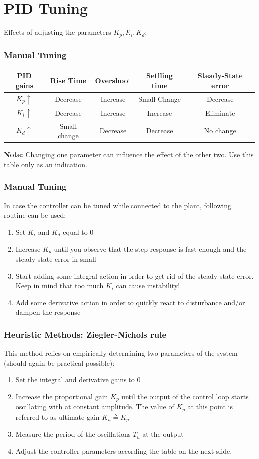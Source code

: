 \section{PID Tuning}

\begin{frame}
	Effects of adjusting the parameters $K_p, K_i, K_d$:
	\vspace{1em}
	\frametitle{Manual Tuning}
	{
	\small
	\begin{tabular}{c | c | c | c | c }
		PID gains	&	Rise Time 	&	Overshoot	&	Setlling time	&	Steady-State error \\
		\hline
		$K_p \uparrow$ & Decrease	&	Increase	&	Small Change	&	Decrease \\
		$K_i \uparrow$ & Decrease	&	Increase	&	Increase		&	Eliminate \\
		$K_d \uparrow$ & Small change &	Decrease	&	Decrease		&	No change \\
	\end{tabular}
	}
	\vspace{1em}
	
	\textbf{Note:} Changing one parameter can influence the effect of the other two. Use this table only as an indication.
\end{frame}

\begin{frame}
	\frametitle{Manual Tuning}
	In case the controller can be tuned while connected to the plant, following routine can be used:
	\begin{enumerate}
		\item Set $K_i$ and $K_d$ equal to 0
		\item Increase $K_p$ until you observe that the step response is fast enough and the steady-state error in small
		\item Start adding some integral action in order to get rid of the steady state error. Keep in mind that too much $K_i$ can cause instability!
		\item Add some derivative action in order to quickly react to disturbance and/or dampen the response
		
	\end{enumerate}
\end{frame}


\begin{frame}
	\frametitle{Heuristic Methods: Ziegler-Nichols rule}
		This method relies on empirically determining two parameters of the system (should again be practical possible):
		\begin{enumerate}
			\item Set the integral and derivative gains to 0
			\item Increase the proportional gain $K_p$ until the output of the control loop starts oscillating with at constant amplitude. The value of $K_p$ at this point is referred to as ultimate gain $K_u \triangleq K_p$
			\item Measure the period of the oscillations $T_u$ at the output
			\item Adjust the controller parameters according the table on the next slide.
		\end{enumerate}
\end{frame}

